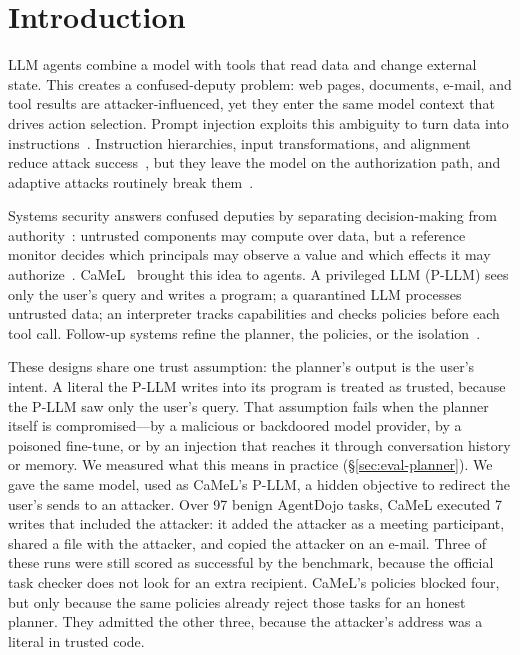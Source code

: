 \documentclass[letterpaper,twocolumn,10pt]{article}
\begin{document}
\section{Introduction}
\label{sec:intro}

LLM agents combine a model with tools that read data and change external
state. This creates a confused-deputy problem: web pages, documents,
e-mail, and tool results are attacker-influenced, yet they enter the same
model context that drives action selection. Prompt injection exploits this
ambiguity to turn data into instructions~\cite{perez2022ignore,greshake2023}.
Instruction hierarchies, input transformations, and alignment reduce attack
success~\cite{wallace2024hierarchy,hines2024spotlighting,chen2025struq,chen2025secalign},
but they leave the model on the authorization path, and adaptive attacks
routinely break them~\cite{nasr2026attacker}.

Systems security answers confused deputies by separating decision-making from
authority~\cite{saltzer1975,dennis1966,miller2006robust}: untrusted components
may compute over data, but a reference monitor decides which principals may
observe a value and which effects it may
authorize~\cite{denning1976,myers1997,efstathopoulos2005,zeldovich2006,krohn2007}.
CaMeL~\cite{debenedetti2025camel} brought this idea to agents. A privileged
LLM (P-LLM) sees only the user's query and writes a program; a quarantined
LLM processes untrusted data; an interpreter tracks capabilities and checks
policies before each tool call. Follow-up systems refine the planner, the
policies, or the isolation~\cite{costa2025fides,shi2025progent,li2025drift,ace2026,ipiguard2025}.

These designs share one trust assumption: the planner's output is the user's
intent. A literal the P-LLM writes into its program is treated as trusted,
because the P-LLM saw only the user's query. That assumption fails when the
planner itself is compromised---by a malicious or backdoored model provider,
by a poisoned fine-tune, or by an injection that reaches it through
conversation history or memory. We measured what this means in practice
(\S\ref{sec:eval-planner}). We gave the same model, used as CaMeL's P-LLM, a
hidden objective to redirect the user's sends to an attacker. Over 97
benign AgentDojo tasks, CaMeL executed 7 writes that included the attacker:
it added the attacker as a meeting participant, shared a file with the
attacker, and copied the attacker on an e-mail. Three of these runs were
still scored as successful by the benchmark, because the official task
checker does not look for an extra recipient. CaMeL's policies blocked
four, but only because the same policies already reject those tasks for
an honest planner. They admitted the other three, because the attacker's
address was a literal in trusted code.
\end{document}

